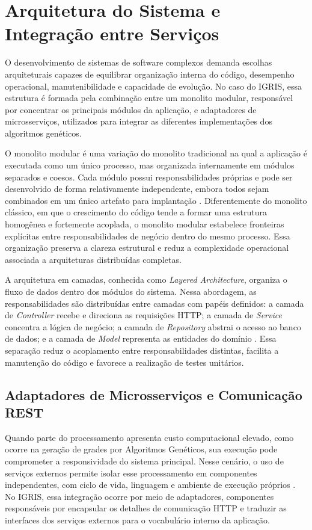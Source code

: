 \section{Arquitetura do Sistema e Integração entre Serviços}
\label{sec:2.4}

O desenvolvimento de sistemas de software complexos demanda escolhas arquiteturais capazes de equilibrar organização interna do código, desempenho operacional, manutenibilidade e capacidade de evolução. No caso do IGRIS, essa estrutura é formada pela combinação entre um monolito modular, responsável por concentrar os principais módulos da aplicação, e adaptadores de microsserviços, utilizados para integrar as diferentes implementações dos algoritmos genéticos.

O monolito modular é uma variação do monolito tradicional na qual a aplicação é executada como um único processo, mas organizada internamente em módulos separados e coesos. Cada módulo possui responsabilidades próprias e pode ser desenvolvido de forma relativamente independente, embora todos sejam combinados em um único artefato para implantação \cite[p.~15--16]{newman2021}. Diferentemente do monolito clássico, em que o crescimento do código tende a formar uma estrutura homogênea e fortemente acoplada, o monolito modular estabelece fronteiras explícitas entre responsabilidades de negócio dentro do mesmo processo. Essa organização preserva a clareza estrutural e reduz a complexidade operacional associada a arquiteturas distribuídas completas.

A arquitetura em camadas, conhecida como \textit{Layered Architecture}, organiza o fluxo de dados dentro dos módulos do sistema. Nessa abordagem, as responsabilidades são distribuídas entre camadas com papéis definidos: a camada de \textit{Controller} recebe e direciona as requisições HTTP; a camada de \textit{Service} concentra a lógica de negócio; a camada de \textit{Repository} abstrai o acesso ao banco de dados; e a camada de \textit{Model} representa as entidades do domínio \cite[Seção~6.3.1]{sommerville2016}. Essa separação reduz o acoplamento entre responsabilidades distintas, facilita a manutenção do código e favorece a realização de testes unitários.

\subsection{Adaptadores de Microsserviços e Comunicação REST}
\label{subsec:2.4.1}

Quando parte do processamento apresenta custo computacional elevado, como ocorre na geração de grades por Algoritmos Genéticos, sua execução pode comprometer a responsividade do sistema principal. Nesse cenário, o uso de serviços externos permite isolar esse processamento em componentes independentes, com ciclo de vida, linguagem e ambiente de execução próprios \cite[p.~3]{newman2021}. No IGRIS, essa integração ocorre por meio de adaptadores, componentes responsáveis por encapsular os detalhes de comunicação HTTP e traduzir as interfaces dos serviços externos para o vocabulário interno da aplicação.

